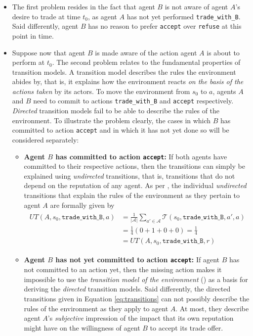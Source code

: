 \begin{itemize}
    \item The first problem resides in the fact that agent $B$ is not aware of agent $A$'s desire to trade at time $t_0$, as agent $A$ has not yet performed \texttt{trade\_with\_B}. Said differently, agent $B$ has no reason to prefer \texttt{accept} over \texttt{refuse} at this point in time.
    \item Suppose now that agent $B$ is made aware of the action agent $A$ is about to perform at $t_0$. The second problem relates to the fundamental properties of transition models. A transition model describes the rules the environment abides by, that is, it explains how the environment reacts \textit{on the basis of the actions taken} by its actors. To move the environment from $s_0$ to $a$, agents $A$ and $B$ need to commit to actions \texttt{trade\_with\_B} and \texttt{accept} respectively. \textit{Directed} transition models fail to be able to describe the rules of the environment. To illustrate the problem clearly, the cases in which $B$ has committed to action \texttt{accept} and in which it has not yet done so will be considered separately: 
    \begin{itemize}
        \item \textbf{Agent $B$ has committed to action \texttt{accept}: }If both agents have committed to their respective actions, then the transitions can simply be explained using \textit{undirected} transitions, that is, transitions that do not depend on the reputation of any agent. As per , the individual \textit{undirected} transitions that explain the rules of the environment as they pertain to agent $A$ are formally given by
        \begin{align*}
            \begin{split}
                UT(A, s_0, \texttt{trade\_with\_B}, a) &= \frac{1}{|\mathcal{A}|} \sum_{a' \in \mathcal{A}} \mathcal{T}(s_0, \texttt{trade\_with\_B}, a', a) 
                \\&= \frac{1}{4} (0 + 1 + 0 + 0) = \frac{1}{4}
                \\&= UT(A, s_0, \texttt{trade\_with\_B}, r)
            \end{split}
        \end{align*}
        
        \item \textbf{Agent $B$ has not yet committed to action \texttt{accept}: }If agent $B$ has not committed to an action yet, then the missing action makes it impossible to use the \textit{transition model of the environment} () as a basis for deriving the \textit{directed} transition models. Said differently, the directed transitions given in Equation \ref{eq:transitions} can not possibly describe the rules of the environment as they apply to agent $A$. At most, they describe agent $A$'s \textit{subjective} impression of the impact that its own reputation might have on the willingness of agent $B$ to accept its trade offer.
    \end{itemize}
\end{itemize}
